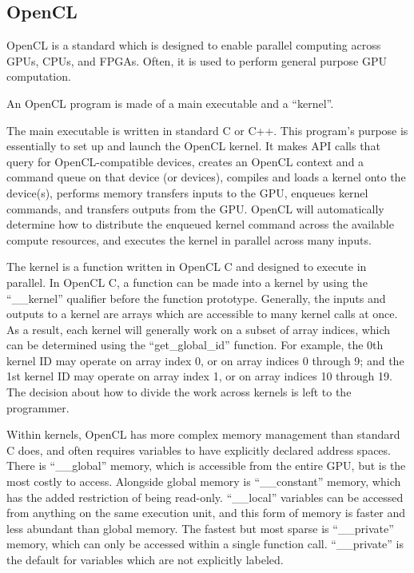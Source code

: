 \documentclass[a4paper,10pt,conference]{IEEEtran}
\begin{document}
\subsection{OpenCL}

OpenCL is a standard\cite{khronos} which is designed to enable parallel computing across GPUs, CPUs, and FPGAs.  Often, it is used to perform general purpose GPU computation.

An OpenCL program is made of a main executable and a ``kernel''.  

The main executable is written in standard C or C++. This program's purpose is essentially to set up and launch the OpenCL kernel.  It makes API calls that query for OpenCL-compatible devices, creates an OpenCL context and a command queue on that device (or devices), compiles and loads a kernel onto the device(s), performs memory transfers inputs to the GPU, enqueues kernel commands, and transfers outputs from the GPU.  OpenCL will automatically determine how to distribute the enqueued kernel command across the available compute resources, and executes the kernel in parallel across many inputs.  

The kernel is a function written in OpenCL C and designed to execute in parallel.  In OpenCL C, a function can be made into a kernel by using the ``\_\_kernel'' qualifier before the function prototype.  Generally, the inputs and outputs to a kernel are arrays which are accessible to many kernel calls at once.  As a result, each kernel will generally work on a subset of array indices, which can be determined using the ``get\_global\_id'' function. For example, the 0th kernel ID may operate on array index 0, or on array indices 0 through 9; and the 1st kernel ID may operate on array index 1, or on array indices 10 through 19.  The decision about how to divide the work across kernels is left to the programmer.

Within kernels, OpenCL has more complex memory management than standard C does, and often requires variables to have explicitly declared address spaces.  There is ``\_\_global'' memory, which is accessible from the entire GPU, but is the most costly to access.  Alongside global memory is ``\_\_constant'' memory, which has the added restriction of being read-only.  ``\_\_local'' variables can be accessed from anything on the same execution unit, and this form of memory is faster and less abundant than global memory. The fastest but most sparse is ``\_\_private'' memory, which can only be accessed within a single function call.  ``\_\_private'' is the default for variables which are not explicitly labeled.
\end{document}
